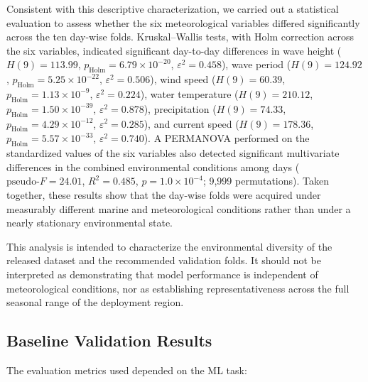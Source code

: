 \documentclass[11pt]{article}
\begin{document}
Consistent with this descriptive characterization, we carried out a statistical evaluation to assess whether the six meteorological variables differed significantly across the ten day-wise folds. Kruskal--Wallis tests, with Holm correction across the six variables, indicated significant day-to-day differences in wave height ($H(9)=113.99$, $p_{\mathrm{Holm}}=6.79\times10^{-20}$, $\varepsilon^2=0.458$), wave period ($H(9)=124.92$, $p_{\mathrm{Holm}}=5.25\times10^{-22}$, $\varepsilon^2=0.506$), wind speed ($H(9)=60.39$, $p_{\mathrm{Holm}}=1.13\times10^{-9}$, $\varepsilon^2=0.224$), water temperature ($H(9)=210.12$, $p_{\mathrm{Holm}}=1.50\times10^{-39}$, $\varepsilon^2=0.878$), precipitation ($H(9)=74.33$, $p_{\mathrm{Holm}}=4.29\times10^{-12}$, $\varepsilon^2=0.285$), and current speed ($H(9)=178.36$, $p_{\mathrm{Holm}}=5.57\times10^{-33}$, $\varepsilon^2=0.740$). A PERMANOVA performed on the standardized values of the six variables also detected significant multivariate differences in the combined environmental conditions among days ($\mathrm{pseudo}\text{-}F=24.01$, $R^2=0.485$, $p=1.0\times10^{-4}$; 9,999 permutations). Taken together, these results show that the day-wise folds were acquired under measurably different marine and meteorological conditions rather than under a nearly stationary environmental state.

This analysis is intended to characterize the environmental diversity of the released dataset and the recommended validation folds. It should not be interpreted as demonstrating that model performance is independent of meteorological conditions, nor as establishing representativeness across the full seasonal range of the deployment region.%

\subsection{Baseline Validation Results}
\label{sec:results}

The evaluation metrics used depended on the ML task:
\end{document}

